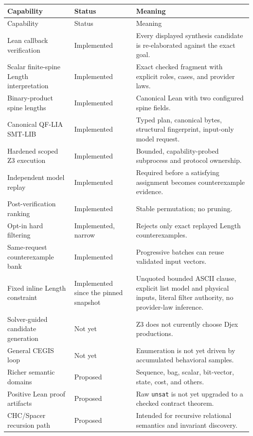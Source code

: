 \documentclass[10pt,letterpaper,oneside]{report}
\newcommand{\code}[1]{\texttt{\detokenize{#1}}}
\newcommand{\unsat}{\texttt{unsat}}
\begin{document}
\begin{longtable}{@{}L{0.34\textwidth}C{0.16\textwidth}L{0.44\textwidth}@{}}
\toprule
Capability & Status & Meaning \\
\midrule
\endfirsthead
\toprule
Capability & Status & Meaning \\
\midrule
\endhead
\bottomrule
\endfoot
Lean callback verification & Implemented & Every displayed synthesis candidate is re-elaborated against the exact goal. \\
Scalar finite-spine Length interpretation & Implemented & Exact checked fragment with explicit roles, cases, and provider laws. \\
Binary-product spine lengths & Implemented & Canonical Lean \code{Prod} with two configured spine fields. \\
Canonical QF-LIA SMT-LIB & Implemented & Typed plan, canonical bytes, structural fingerprint, input-only model request. \\
Hardened scoped Z3 execution & Implemented & Bounded, capability-probed subprocess and protocol ownership. \\
Independent model replay & Implemented & Required before a satisfying assignment becomes counterexample evidence. \\
Post-verification ranking & Implemented & Stable permutation; no pruning. \\
Opt-in hard filtering & Implemented, narrow & Rejects only exact replayed Length counterexamples. \\
Same-request counterexample bank & Implemented & Progressive batches can reuse validated input vectors. \\
Fixed inline Length constraint & Implemented since the pinned snapshot & Unquoted bounded ASCII clause, explicit list model and physical inputs, literal filter authority, no provider-law inference. \\
Solver-guided candidate generation & Not yet & Z3 does not currently choose Djex productions. \\
General CEGIS loop & Not yet & Enumeration is not yet driven by accumulated behavioral samples. \\
Richer semantic domains & Proposed & Sequence, bag, scalar, bit-vector, state, cost, and others. \\
Positive Lean proof artifacts & Proposed & Raw \unsat{} is not yet upgraded to a checked contract theorem. \\
CHC/Spacer recursion path & Proposed & Intended for recursive relational semantics and invariant discovery. \\
\end{longtable}
\end{document}
